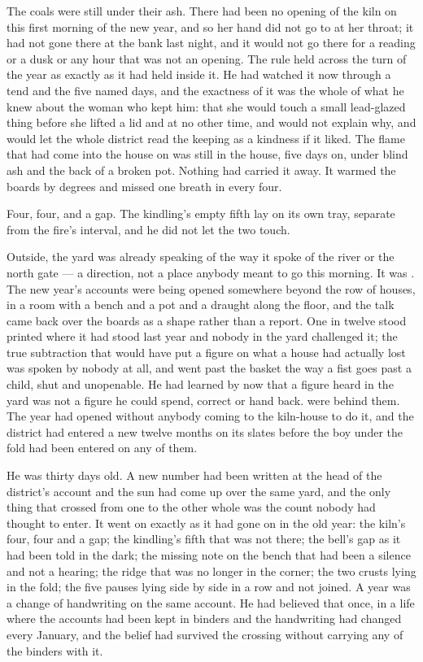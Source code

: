The coals were still under their ash. There had been no opening of the kiln on this first morning of the new year, and so her hand did not go to  at her throat; it had not gone there at the bank last night, and it would not go there for a reading or a dusk or any hour that was not an opening. The rule held across the turn of the year as exactly as it had held inside it. He had watched it now through a tend and the five named days, and the exactness of it was the whole of what he knew about the woman who kept him: that she would touch a small lead-glazed thing before she lifted a lid and at no other time, and would not explain why, and would let the whole district read the keeping as a kindness if it liked. The flame that had come into the house on  was still in the house, five days on, under blind ash and the back of a broken pot. Nothing had carried it away. It warmed the boards by degrees and missed one breath in every four.

Four, four, and a gap. The kindling's empty fifth lay on its own tray, separate from the fire's interval, and he did not let the two touch.

Outside, the yard was already speaking of  the way it spoke of the river or the north gate --- a direction, not a place anybody meant to go this morning. It was . The new year's accounts were being opened somewhere beyond the row of houses, in a room with a bench and a pot and a draught along the floor, and the talk came back over the boards as a shape rather than a report. One in twelve stood printed where it had stood last year and nobody in the yard challenged it; the true subtraction that would have put a figure on what a house had actually lost was spoken by nobody at all, and went past the basket the way a fist goes past a child, shut and unopenable. He had learned by now that a figure heard in the yard was not a figure he could spend, correct or hand back.  were behind them. The year had opened without anybody coming to the kiln-house to do it, and the district had entered a new twelve months on its slates before the boy under the fold had been entered on any of them.

\scenebreak

He was thirty days old. A new number had been written at the head of the district's account and the sun had come up over the same yard, and the only thing that crossed from one to the other whole was the count nobody had thought to enter. It went on exactly as it had gone on in the old year: the kiln's four, four and a gap; the kindling's fifth that was not there; the bell's gap as it had been told in the dark; the missing note on the bench that had been a silence and not a hearing; the ridge that was no longer in the corner; the two crusts lying in the fold; the five pauses lying side by side in a row and not joined. A year was a change of handwriting on the same account. He had believed that once, in a life where the accounts had been kept in binders and the handwriting had changed every January, and the belief had survived the crossing without carrying any of the binders with it.

